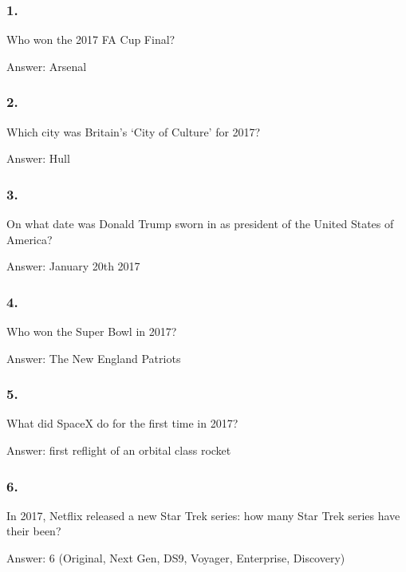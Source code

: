 \documentclass{beamer}
\begin{document}
    \begin{frame}
        \frametitle{1.}
        Who won the 2017 FA Cup Final?\\ 

        \begin{center}
            Answer: Arsenal
        \end{center}
    \end{frame}

    \begin{frame}
        \frametitle{2.}
        Which city was Britain's `City of Culture' for 2017?\\

        \begin{center}
            Answer: Hull
        \end{center}
    \end{frame}

    \begin{frame}
        \frametitle{3.}
        On what date was Donald Trump sworn in as president of the United
        States of America?\\

        \begin{center}
            Answer: January 20th 2017
        \end{center}
    \end{frame}

    \begin{frame}
        \frametitle{4.}
        Who won the Super Bowl in 2017?\\

        \begin{center}
            Answer: The New England Patriots
        \end{center}
    \end{frame}

    \begin{frame}
        \frametitle{5.}
        What did SpaceX do for the first time in 2017?\\

        \begin{center}
            Answer: first reflight of an orbital class rocket
        \end{center}
    \end{frame}

    \begin{frame}
        \frametitle{6.}
        In 2017, Netflix released a new Star Trek series: how many Star Trek
        series have their been?\\

        \begin{center}
            Answer: 6 (Original, Next Gen, DS9, Voyager, Enterprise, Discovery)
        \end{center}
    \end{frame}
\end{document}
